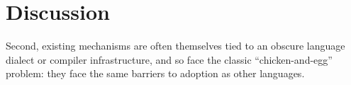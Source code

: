 \documentclass[preprint,10pt]{sigplanconf}
\begin{document}
\section{Discussion}\label{sec:discussion}






Second, existing mechanisms are often themselves  tied to an obscure language dialect or compiler infrastructure, and so face the classic ``chicken-and-egg'' problem: they face the same barriers to adoption as other languages. %
\end{document}

